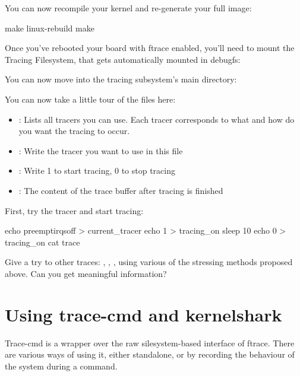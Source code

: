 You can now recompile your kernel and re-generate your full image:

\begin{bashinput}
make linux-rebuild
make
\end{bashinput}

Once you've rebooted your board with ftrace enabled, you'll need to mount the
Tracing Filesystem, that gets automatically mounted in debugfs:



You can now move into the tracing subsystem's main directory:


You can now take a little tour of the files here:

\begin{itemize}
	\item {}: Lists all tracers you can use. Each tracer
		corresponds to what and how do you want the tracing to occur.
	\item {}: Write the tracer you want to use in this file
	\item {}: Write 1 to start tracing, 0 to stop tracing
	\item {}: The content of the trace buffer after tracing is finished
\end{itemize}

First, try the  tracer and start tracing:

\begin{bashinput}
echo preemptirqsoff > current_tracer
echo 1 > tracing_on
sleep 10
echo 0 > tracing_on
cat trace
\end{bashinput}

Give a try to other traces: , , ,
using various of the stressing methods proposed above. Can you get meaningful information?

\section{Using trace-cmd and kernelshark}

Trace-cmd is a wrapper over the raw silesystem-based interface of ftrace. There
are various ways of using it, either standalone, or by recording the behaviour
of the system during a command.

